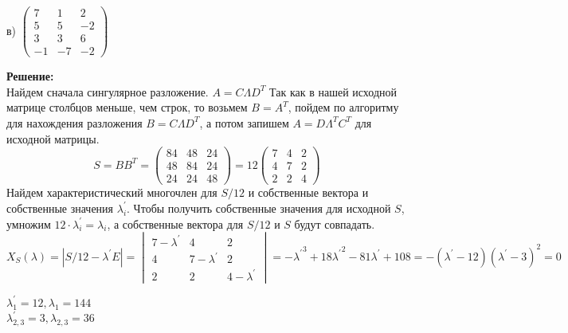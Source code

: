 \documentclass[a4paper,12pt]{article}
\begin{document}
\begin{enumerate}
в) 
$
\begin{pmatrix}
7 & 1 & 2\\
5 & 5 & -2\\
3 & 3 & 6\\
-1 & -7 & -2
\end{pmatrix}
$

\vspace{5pt}
\textbf{Решение:}\\
Найдем сначала сингулярное разложение.
$A = C \Lambda D^T$
Так как в нашей исходной матрице столбцов меньше, чем строк, то возьмем $B=A^T$, пойдем по алгоритму для нахождения разложения $B=C\Lambda D^T$, а потом запишем $A=D {\Lambda}^T C^T$ для исходной матрицы.
$$S = B B^T = \begin{pmatrix}
84&48&24\\
48&84&24\\
24&24&48
\end{pmatrix}=12\begin{pmatrix}
7&4&2\\
4&7&2\\
2&2&4
\end{pmatrix}$$
Найдем характеристический многочлен для $S/12$ и собственные вектора и собственные значения $\lambda_i^{'}$. Чтобы получить собственные значения для исходной $S$, умножим $12 \cdot  \lambda_i^{'}=\lambda_i$, а собственные вектора для $S/12$ и $S$ будут совпадать.
$X_S(\lambda) = |S/12-\lambda^{'} E|= \begin{vmatrix} 
7-\lambda^{'}&4&2\\
4&7-\lambda^{'}&2\\
2&2&4-\lambda^{'}
\end{vmatrix}=-{\lambda^{'}}^3+18{\lambda^{'}}^2-81{\lambda^{'}}+108=-({\lambda^{'}}-12)({\lambda^{'}}-3)^2=0$

$\lambda_1^{'}=12, \lambda_1=144$\\
$\lambda_{2,3}^{'}=3, \lambda_{2,3}=36$\\


\end{enumerate}
\end{document}
